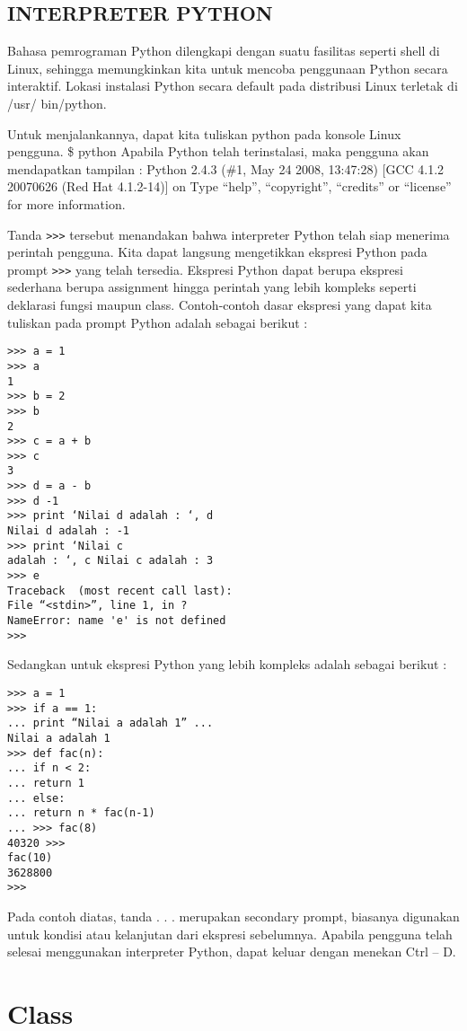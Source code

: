 \subsection{INTERPRETER PYTHON}
Bahasa pemrograman Python dilengkapi dengan suatu fasilitas seperti shell di Linux, sehingga memungkinkan kita untuk mencoba 
penggunaan Python secara interaktif. Lokasi instalasi Python secara default pada distribusi Linux terletak di /usr/ bin/python.

Untuk menjalankannya, dapat kita tuliskan python pada konsole Linux pengguna. \$ python Apabila Python telah terinstalasi, 
maka pengguna akan mendapatkan tampilan : Python 2.4.3 (\#1, May 24 2008, 13:47:28) [GCC 4.1.2 20070626 (Red Hat 4.1.2-14)] on 
Type “help”, “copyright”, “credits” or “license” for more information.

Tanda \verb|>>>| tersebut menandakan bahwa interpreter Python telah siap menerima perintah pengguna. Kita dapat langsung mengetikkan 
ekspresi Python pada prompt \verb|>>>| yang telah tersedia. Ekspresi Python dapat berupa ekspresi sederhana berupa assignment hingga 
perintah yang lebih kompleks seperti deklarasi fungsi maupun class. Contoh-contoh dasar ekspresi yang dapat kita tuliskan pada 
prompt Python adalah sebagai berikut : 

\begin{verbatim}
>>> a = 1 
>>> a 
1 
>>> b = 2 
>>> b 
2 
>>> c = a + b 
>>> c 
3 
>>> d = a - b 
>>> d -1
>>> print ‘Nilai d adalah : ‘, d
Nilai d adalah : -1
>>> print ‘Nilai c 
adalah : ‘, c Nilai c adalah : 3 
>>> e
Traceback  (most recent call last):
File “<stdin>”, line 1, in ? 
NameError: name 'e' is not defined
>>>
\end{verbatim}
Sedangkan untuk ekspresi Python yang lebih kompleks adalah sebagai berikut : 
\begin{verbatim}
>>> a = 1 
>>> if a == 1:
... print “Nilai a adalah 1” ...
Nilai a adalah 1 
>>> def fac(n):
... if n < 2: 
... return 1 
... else: 
... return n * fac(n-1) 
... >>> fac(8) 
40320 >>> 
fac(10) 
3628800 
>>>
\end{verbatim}

Pada contoh diatas, tanda . . . merupakan secondary prompt, biasanya digunakan untuk kondisi atau kelanjutan dari ekspresi 
sebelumnya. Apabila pengguna telah selesai menggunakan interpreter Python, dapat keluar dengan menekan Ctrl – D.
	

\section{Class}
